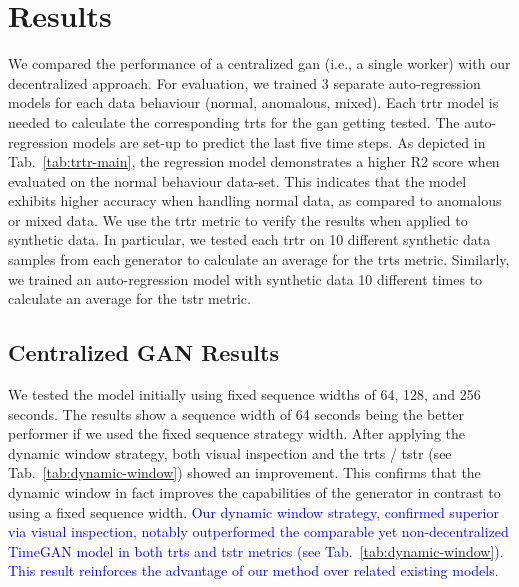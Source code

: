 \section{Results}


We compared the performance of a centralized \gls*{gan} (i.e., a single worker) with our decentralized approach. For evaluation, we trained 3 separate auto-regression models for each data behaviour (normal, anomalous, mixed). Each \gls*{trtr} model is needed to calculate the corresponding \gls*{trts} for the \gls*{gan} getting tested. The auto-regression models are set-up to predict the last five time steps.
%
As depicted in Tab.~\ref{tab:trtr-main}, the regression model demonstrates a higher R2 score when evaluated on the normal behaviour data-set. This indicates that the model exhibits higher accuracy when handling normal data, as compared to anomalous or mixed data. We use the \gls*{trtr} metric to verify the results when applied to synthetic data. In particular, we tested each \gls*{trtr} on 10 different synthetic data samples from each generator to calculate an average for the \gls*{trts} metric. Similarly, we trained an auto-regression model with synthetic data 10 different times to calculate an average for the \gls*{tstr} metric.




\subsection{Centralized GAN Results}

We tested the model initially using fixed sequence widths of 64, 128, and 256 seconds. The results show a sequence width of 64 seconds being the better performer if we used the fixed sequence strategy width. After applying the dynamic window strategy, both visual inspection and the \gls*{trts} / \gls*{tstr} (see Tab.~\ref{tab:dynamic-window}) showed an improvement. This confirms that the dynamic window in fact improves the capabilities of the generator in contrast to using a fixed sequence width. \textcolor{blue}{Our dynamic window strategy, confirmed superior via visual inspection, notably outperformed the comparable yet non-decentralized TimeGAN model in both \gls*{trts} and \gls*{tstr} metrics (see Tab.~\ref{tab:dynamic-window}). This result reinforces the advantage of our method over related existing models.}


